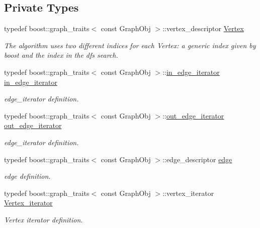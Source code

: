 \subsection*{Private Types}
\begin{DoxyCompactItemize}
\item 
typedef boost\+::graph\+\_\+traits$<$ const Graph\+Obj $>$\+::vertex\+\_\+descriptor \hyperlink{classdom__info_a5e4ca21e2c5281bdbb95d2c8d965c9be}{Vertex}
\begin{DoxyCompactList}\small\item\em The algorithm uses two different indices for each Vertex\+: a generic index given by boost and the index in the dfs search. \end{DoxyCompactList}\item 
typedef boost\+::graph\+\_\+traits$<$ const Graph\+Obj $>$\+::\hyperlink{classdom__info_a295dcc01454ddf008ede1c584f7c1f26}{in\+\_\+edge\+\_\+iterator} \hyperlink{classdom__info_a295dcc01454ddf008ede1c584f7c1f26}{in\+\_\+edge\+\_\+iterator}
\begin{DoxyCompactList}\small\item\em edge\+\_\+iterator definition. \end{DoxyCompactList}\item 
typedef boost\+::graph\+\_\+traits$<$ const Graph\+Obj $>$\+::\hyperlink{classdom__info_a579f96dd47b2e5aa21a1f875abae54ec}{out\+\_\+edge\+\_\+iterator} \hyperlink{classdom__info_a579f96dd47b2e5aa21a1f875abae54ec}{out\+\_\+edge\+\_\+iterator}
\begin{DoxyCompactList}\small\item\em edge\+\_\+iterator definition. \end{DoxyCompactList}\item 
typedef boost\+::graph\+\_\+traits$<$ const Graph\+Obj $>$\+::edge\+\_\+descriptor \hyperlink{classdom__info_a61a309b17126a4b52e28adc4b6d1b45a}{edge}
\begin{DoxyCompactList}\small\item\em edge definition. \end{DoxyCompactList}\item 
typedef boost\+::graph\+\_\+traits$<$ const Graph\+Obj $>$\+::vertex\+\_\+iterator \hyperlink{classdom__info_aeb973e792e54d415b4c81524f85aee80}{Vertex\+\_\+iterator}
\begin{DoxyCompactList}\small\item\em Vertex iterator definition. \end{DoxyCompactList}\end{DoxyCompactItemize}
